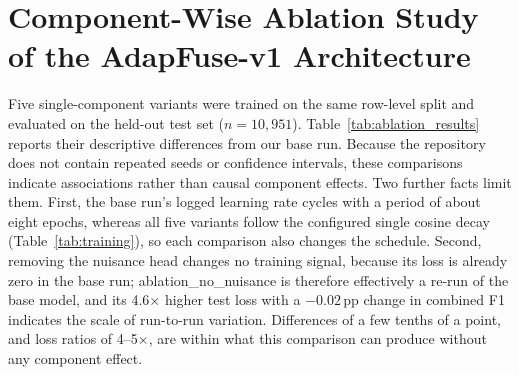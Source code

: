 \section{Component-Wise Ablation Study of the AdapFuse-v1 Architecture}
\label{sec:component_ablations}

Five single-component variants were trained on the same row-level split and evaluated on the held-out test set ($n=10{,}951$). Table~\ref{tab:ablation_results} reports their descriptive differences from our base run. Because the repository does not contain repeated seeds or confidence intervals, these comparisons indicate associations rather than causal component effects. Two further facts limit them. First, the base run's logged learning rate cycles with a period of about eight epochs, whereas all five variants follow the configured single cosine decay (Table~\ref{tab:training}), so each comparison also changes the schedule. Second, removing the nuisance head changes no training signal, because its loss is already zero in the base run; ablation\_no\_nuisance is therefore effectively a re-run of the base model, and its 4.6$\times$ higher test loss with a $-0.02$\,pp change in combined F1 indicates the scale of run-to-run variation. Differences of a few tenths of a point, and loss ratios of 4--5$\times$, are within what this comparison can produce without any component effect.

